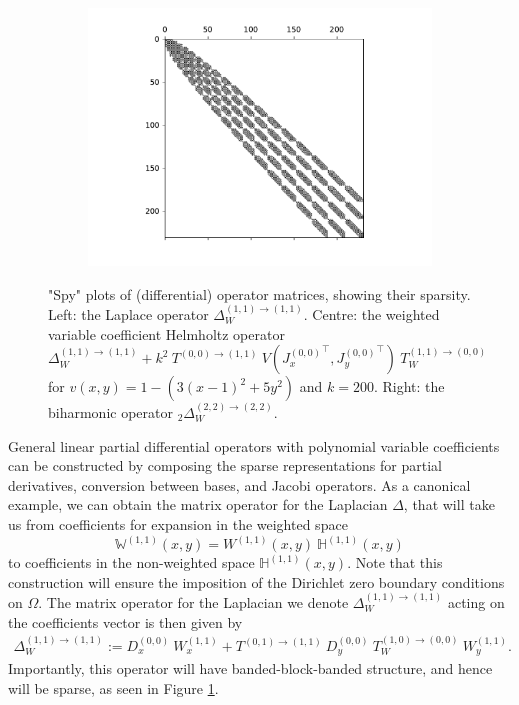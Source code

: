 \documentclass[11pt, oneside]{article}   	%
\newcommand{\hdop}{H}
\newcommand{\Wii}{W^{(1,1)}}
\newcommand{\bighdopii}{{\mathbb{\hdop}^{(1,1)}}}
\newcommand{\laplacewii}{\Delta_W^{(1,1)\to(1,1)}}
\newcommand{\biharmonic}{_2\Delta_W^{(2,2)\to(2,2)}}
\newcommand{\bigWii}{{\mathbb{W}^{(1,1)}}}
\begin{document}
\begin{figure}[t]
\begin{subfigure}{0.32\textwidth}
	\includegraphics[scale=0.35]{sparsityofbiharmonic}
        \centering
	\end{subfigure}
    	\caption{"Spy" plots of (differential) operator matrices, showing their sparsity. Left: the Laplace operator $\laplacewii$. Centre: the weighted variable coefficient Helmholtz operator $\laplacewii + k^2 \: T^{(0,0)\to(1,1)} \: V({J_x^{(0,0)}}^\top, {J_y^{(0,0)}}^\top) \: T_W^{(1,1)\to(0,0)}$ for $v(x,y) = 1 - (3(x-1)^2 + 5y^2)$ and $k = 200$. Right: the biharmonic operator $\biharmonic$.}
        \label{fig:sparsity}
        \centering
\end{figure}

General linear partial differential operators with polynomial variable coefficients can be constructed by composing the sparse representations for partial derivatives, conversion between bases, and Jacobi operators. As a canonical example, we can obtain the matrix operator for the Laplacian \(\Delta\), that will take us from coefficients for expansion in the weighted space
$$
\bigWii(x,y) = \Wii(x,y) \: \bighdopii(x,y)
$$
to coefficients in the non-weighted space $\bighdopii(x,y)$. Note that this construction will ensure the imposition of the Dirichlet zero boundary conditions on $\Omega$. The matrix operator for the Laplacian we denote $\laplacewii$ acting on the coefficients vector is then given by
\begin{align*}
    \laplacewii := D_x^{(0,0)} \: W_x^{(1,1)} + T^{(0,1)\to(1,1)} \: D_y^{(0,0)} \: T_W^{(1,0)\to(0,0)} \: W_y^{(1,1)}.
\end{align*}
Importantly, this operator will have banded-block-banded structure, and hence will be sparse, as seen in Figure \ref{fig:sparsity}.
\end{document}
